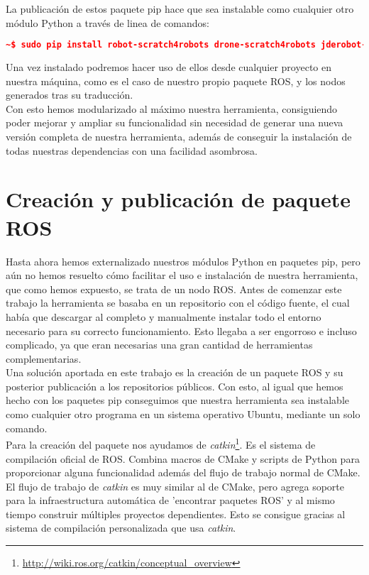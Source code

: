 La publicación de estos paquete pip hace que sea instalable como cualquier otro módulo Python a través de linea de comandos:\\ 

\begin{lstlisting}[language=json,firstnumber=1]
~$ sudo pip install robot-scratch4robots drone-scratch4robots jderobot-kurt jderobot-jderobottypes jderobot-ros jderobot-config
\end{lstlisting}

Una vez instalado podremos hacer uso de ellos desde cualquier proyecto en nuestra máquina, como es el caso de nuestro propio paquete ROS, y los nodos generados tras su traducción.\\

Con esto hemos modularizado al máximo nuestra herramienta, consiguiendo poder mejorar y ampliar su funcionalidad sin necesidad de generar una nueva versión completa de nuestra herramienta, además de conseguir la instalación de todas nuestras dependencias con una facilidad asombrosa.
\section{Creación y publicación de paquete ROS}
\label{sec:paquete-ros}
Hasta ahora hemos externalizado nuestros módulos Python en paquetes pip, pero aún no hemos resuelto cómo facilitar el uso e instalación de nuestra herramienta, que como hemos expuesto, se trata de un nodo ROS. Antes de comenzar este trabajo la herramienta se basaba en un repositorio con el código fuente, el cual había que descargar al completo y manualmente instalar todo el entorno necesario para su correcto funcionamiento. Esto llegaba a ser engorroso e incluso complicado, ya que eran necesarias una gran cantidad de herramientas complementarias.\\

Una solución aportada en este trabajo es la creación de un paquete ROS y su posterior publicación a los repositorios públicos. Con esto, al igual que hemos hecho con los paquetes pip conseguimos que nuestra herramienta sea instalable como cualquier otro programa en un sistema operativo Ubuntu, mediante un solo comando. \\

Para la creación del paquete nos ayudamos de \textit{catkin}\footnote{\url{http://wiki.ros.org/catkin/conceptual_overview}}. Es el sistema de compilación oficial de ROS. Combina macros de CMake y scripts de Python para proporcionar alguna funcionalidad además del flujo de trabajo normal de CMake. El flujo de trabajo de \textit{catkin} es muy similar al de CMake, pero agrega soporte para la infraestructura automática de 'encontrar paquetes ROS' y al mismo tiempo construir múltiples proyectos dependientes. Esto se consigue gracias al sistema de compilación personalizada que usa \textit{catkin}.\\

